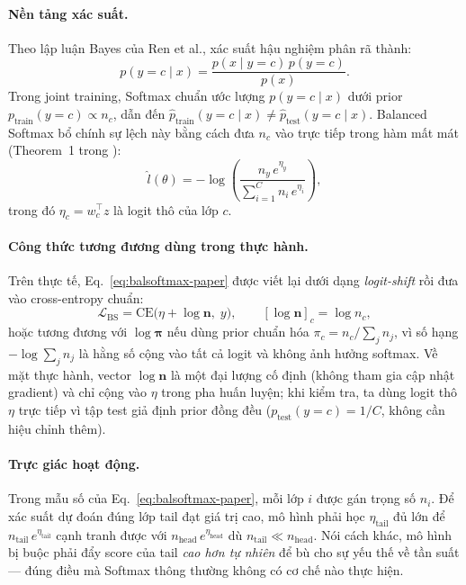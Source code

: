 \paragraph{Nền tảng xác suất.}
Theo lập luận Bayes của Ren et al., xác suất hậu nghiệm phân rã thành:
\begin{equation}
    p(y=c \mid x)
    = \frac{p(x \mid y=c)\,p(y=c)}{p(x)}.
    \label{eq:bayes}
\end{equation}
Trong joint training, Softmax chuẩn ước lượng $p(y=c \mid x)$ dưới prior
$p_{\text{train}}(y=c) \propto n_c$, dẫn đến $\hat{p}_{\text{train}}(y=c \mid x)
\neq \hat{p}_{\text{test}}(y=c \mid x)$.
Balanced Softmax bổ chính sự lệch này bằng cách đưa $n_c$ vào trực tiếp
trong hàm mất mát (Theorem~1 trong \cite{ren2020balanced}):
\begin{equation}
    \hat{l}(\theta)
    = -\log\!\left(\frac{n_y\,e^{\eta_y}}{\displaystyle\sum_{i=1}^{C} n_i\,e^{\eta_i}}\right),
    \label{eq:balsoftmax-paper}
\end{equation}
trong đó $\eta_c = w_c^\top z$ là logit thô của lớp $c$.

\paragraph{Công thức tương đương dùng trong thực hành.}
Trên thực tế, Eq.~\eqref{eq:balsoftmax-paper} được viết lại dưới dạng
\emph{logit-shift} rồi đưa vào cross-entropy chuẩn:
\begin{equation}
    \mathcal{L}_{\text{BS}}
    = \mathrm{CE}\!\big(\eta + \log \mathbf{n},\; y\big),
    \qquad
    [\log \mathbf{n}]_c = \log n_c,
    \label{eq:balsoftmax-impl}
\end{equation}
hoặc tương đương với $\log\boldsymbol{\pi}$ nếu dùng prior chuẩn hóa
$\pi_c = n_c / \sum_j n_j$, vì số hạng $-\log\!\sum_j n_j$ là hằng số
cộng vào tất cả logit và không ảnh hưởng softmax.
Về mặt thực hành, vector $\log \mathbf{n}$ là một đại lượng cố định
(không tham gia cập nhật gradient) và chỉ cộng vào $\eta$ trong pha huấn luyện;
khi kiểm tra, ta dùng logit thô $\eta$ trực tiếp vì tập test
giả định prior đồng đều ($p_{\text{test}}(y=c)=1/C$, không cần hiệu chỉnh thêm).

\paragraph{Trực giác hoạt động.}
Trong mẫu số của Eq.~\eqref{eq:balsoftmax-paper}, mỗi lớp $i$ được gán trọng số $n_i$.
Để xác suất dự đoán đúng lớp tail đạt giá trị cao, mô hình phải học $\eta_{\text{tail}}$
đủ lớn để $n_{\text{tail}}\,e^{\eta_{\text{tail}}}$ cạnh tranh được với
$n_{\text{head}}\,e^{\eta_{\text{head}}}$ dù $n_{\text{tail}} \ll n_{\text{head}}$.
Nói cách khác, mô hình bị buộc phải đẩy score của tail \emph{cao hơn tự nhiên}
để bù cho sự yếu thế về tần suất --- đúng điều mà Softmax thông thường
không có cơ chế nào thực hiện.

